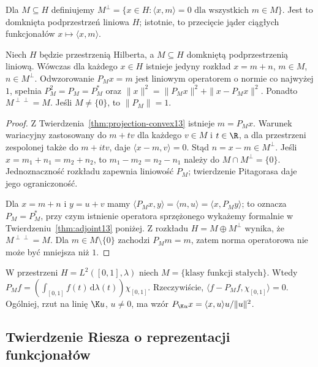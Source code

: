 \begin{definicja}
\label{def:orth-complement13}
Dla $M\subseteq H$ definiujemy
$M^\perp=\{x\in H:\langle x,m\rangle=0\text{ dla wszystkich }m\in M\}$.
Jest to domknięta podprzestrzeń liniowa $H$; istotnie, to
przecięcie jąder ciągłych funkcjonałów $x\mapsto\langle x,m\rangle$.
\end{definicja}

\begin{twierdzenie}
\label{thm:orth-decomposition13}
Niech $H$ będzie przestrzenią Hilberta, a $M\subseteq H$ domkniętą
podprzestrzenią liniową. Wówczas dla każdego $x\in H$ istnieje
jedyny rozkład $x=m+n$, $m\in M$, $n\in M^\perp$.
Odwzorowanie $P_Mx=m$ jest liniowym operatorem o normie co najwyżej
$1$, spełnia $P_M^2=P_M=P_M^*$ oraz
$\|x\|^2=\|P_Mx\|^2+\|x-P_Mx\|^2$.
Ponadto $M^{\perp\perp}=M$.
Jeśli $M\ne\{0\}$, to $\|P_M\|=1$.
\end{twierdzenie}
\begin{proof}
Z Twierdzenia~\ref{thm:projection-convex13} istnieje $m=P_Mx$.
Warunek wariacyjny zastosowany do $m+tv$ dla każdego $v\in M$
i $t\in\R$, a dla przestrzeni zespolonej także do $m+itv$,
daje $\langle x-m,v\rangle=0$. Stąd $n=x-m\in M^\perp$.
Jeśli $x=m_1+n_1=m_2+n_2$, to $m_1-m_2=n_2-n_1$ należy
do $M\cap M^\perp=\{0\}$. Jednoznaczność rozkładu zapewnia
liniowość $P_M$; twierdzenie Pitagorasa daje jego ograniczoność.

Dla $x=m+n$ i $y=u+v$ mamy
$\langle P_Mx,y\rangle=\langle m,u\rangle
=\langle x,P_My\rangle$; to oznacza $P_M=P_M^*$,
przy czym istnienie operatora sprzężonego wykażemy formalnie
w Twierdzeniu~\ref{thm:adjoint13} poniżej.
Z rozkładu $H=M\oplus M^\perp$ wynika, że
$M^{\perp\perp}=M$. Dla $m\in M\setminus\{0\}$ zachodzi
$P_Mm=m$, zatem norma operatorowa nie może być mniejsza niż $1$.
\end{proof}

\begin{przyklad}
\label{ex:projection-mean13}
W przestrzeni $H=L^2([0,1],\lambda)$ niech
$M=\{\text{klasy funkcji stałych}\}$. Wtedy
$P_Mf=(\int_{[0,1]}f(t)\,\mathrm d\lambda(t))\chi_{[0,1]}$.
Rzeczywiście, $\langle f-P_Mf,\chi_{[0,1]}\rangle=0$.
Ogólniej, rzut na linię $\K u$, $u\ne0$, ma wzór
$P_{\K u}x=\langle x,u\rangle u/\|u\|^2$.
\end{przyklad}

\subsection{Twierdzenie Riesza o reprezentacji funkcjonałów}

